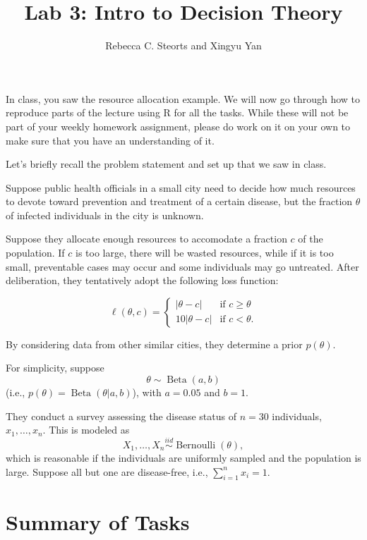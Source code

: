 \documentclass[
]{article}
\title{Lab 3: Intro to Decision Theory}
\author{Rebecca C. Steorts and Xingyu Yan}
\date{}
\DeclareMathOperator*{\Bernoulli}{Bernoulli}
\DeclareMathOperator*{\Beta}{Beta}
\newcommand{\branch}[4]{
\left\{
	\begin{array}{ll}
		#1  & \mbox{if } #2 \\
		#3 & \mbox{if } #4
	\end{array}
\right.
}
\begin{document}
\maketitle

In class, you saw the resource allocation example. We will now go
through how to reproduce parts of the lecture using R for all the tasks.
While these will not be part of your weekly homework assignment, please
do work on it on your own to make sure that you have an understanding of
it.

Let's briefly recall the problem statement and set up that we saw in
class.

Suppose public health officials in a small city need to decide how much
resources to devote toward prevention and treatment of a certain
disease, but the fraction \(\theta\) of infected individuals in the city
is unknown.

Suppose they allocate enough resources to accomodate a fraction \(c\) of
the population. If \(c\) is too large, there will be wasted resources,
while if it is too small, preventable cases may occur and some
individuals may go untreated. After deliberation, they tentatively adopt
the following loss function:

\[\ell(\theta,c) =\branch{|\theta-c|}{c\geq\theta}
                       {10|\theta-c|}{c<\theta.}\]

By considering data from other similar cities, they determine a prior
\(p(\theta)\).

For simplicity, suppose \[\theta \sim \Beta(a,b)\] (i.e.,
\(p(\theta) = \Beta(\theta|a,b)\)), with \(a=0.05\) and \(b=1\).

They conduct a survey assessing the disease status of \(n=30\)
individuals, \(x_1,\ldots,x_n\). This is modeled as
\[X_1,\ldots,X_n \stackrel{iid}{\sim} \Bernoulli(\theta),\] which is
reasonable if the individuals are uniformly sampled and the population
is large. Suppose all but one are disease-free, i.e.,
\(\sum_{i=1}^n x_i = 1\).

\hypertarget{summary-of-tasks}{%
\section{Summary of Tasks}\label{summary-of-tasks}}
\end{document}
